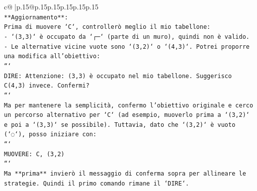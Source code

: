 \documentclass{article}
\begin{document}
{\begin{supertabular}{c@{$\;$}|p{.15\linewidth}@{}p{.15\linewidth}p{.15\linewidth}p{.15\linewidth}p{.15\linewidth}p{.15\linewidth}}
{{{\\ 
\texttt{**Aggiornamento**:} \\
\texttt{Prima di muovere `C`, controllerò meglio il mio tabellone:} \\
\texttt{{-} `(3,3)` è occupato da `┌─` (parte di un muro), quindi non è valido.} \\
\texttt{{-} Le alternative vicine vuote sono `(3,2)` o `(4,3)`. Potrei proporre una modifica all'obiettivo:} \\
\texttt{```} \\
\texttt{DIRE: Attenzione: (3,3) è occupato nel mio tabellone. Suggerisco C(4,3) invece. Confermi?} \\
\texttt{```} \\
\texttt{Ma per mantenere la semplicità, confermo l'obiettivo originale e cerco un percorso alternativo per `C` (ad esempio, muoverlo prima a `(3,2)` e poi a `(3,3)` se possibile). Tuttavia, dato che `(3,2)` è vuoto (`◌`), posso iniziare con:} \\
\texttt{```} \\
\texttt{MUOVERE: C, (3,2)} \\
\texttt{```} \\
\texttt{Ma **prima** invierò il messaggio di conferma sopra per allineare le strategie. Quindi il primo comando rimane il `DIRE`.} \\
            }
        }
    }
     \\ \\


\end{supertabular}}
\end{document}
